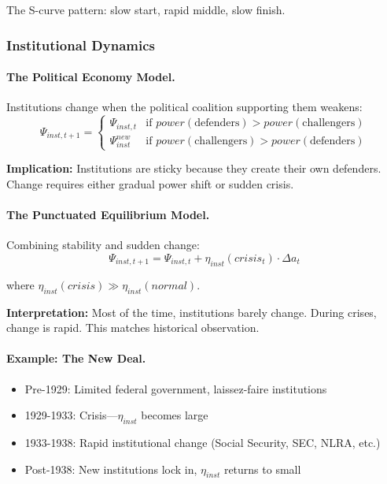 \documentclass[12pt,a4paper]{article}
\begin{document}
The S-curve pattern: slow start, rapid middle, slow finish.

\subsubsection{Institutional Dynamics}

\paragraph{The Political Economy Model.}
Institutions change when the political coalition supporting them weakens:
\begin{equation}
  \Psi_{inst, t+1} = \begin{cases}
    \Psi_{inst, t} & \text{if } power(\text{defenders}) > power(\text{challengers}) \\
    \Psi_{inst}^{new} & \text{if } power(\text{challengers}) > power(\text{defenders})
  \end{cases}
\end{equation}

\textbf{Implication:} Institutions are sticky because they create their own defenders.
Change requires either gradual power shift or sudden crisis.

\paragraph{The Punctuated Equilibrium Model.}
Combining stability and sudden change:
\begin{equation}
  \Psi_{inst, t+1} = \Psi_{inst, t} + \eta_{inst}(crisis_t) \cdot \Delta a_t
\end{equation}

where $\eta_{inst}(crisis) \gg \eta_{inst}(normal)$.

\textbf{Interpretation:} Most of the time, institutions barely change.
During crises, change is rapid. This matches historical observation.

\paragraph{Example: The New Deal.}
\begin{itemize}
  \item Pre-1929: Limited federal government, laissez-faire institutions
  \item 1929-1933: Crisis---$\eta_{inst}$ becomes large
  \item 1933-1938: Rapid institutional change (Social Security, SEC, NLRA, etc.)
  \item Post-1938: New institutions lock in, $\eta_{inst}$ returns to small
\end{itemize}
\end{document}

